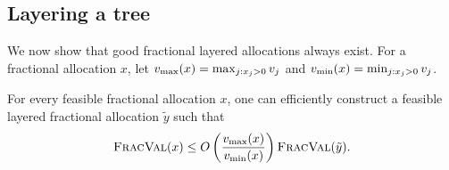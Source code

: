 

\subsection{Layering a tree}
\label{sec:layered-alloc}

We now show that good fractional layered allocations always exist. For
a fractional allocation $x$, let $v_{\max}(x) = \max_{j: {x_{j}}>0} v_j$ and
$v_{\min}(x) = \min_{j: {x_{j}}>0} v_j$. 

\begin{lemma}
    \label{thm:layered-tree}
    For every feasible fractional allocation $x$, one can efficiently
    construct a feasible layered fractional allocation $\tilde{y}$
    such that
    \[
        {\normalfont\textsc{FracVal}}(x) \le O\left(\frac{v_{\max}(x)}{v_{\min}(x)}\right) {\normalfont\textsc{FracVal}}(\tilde{y}).
    \]
\end{lemma}

